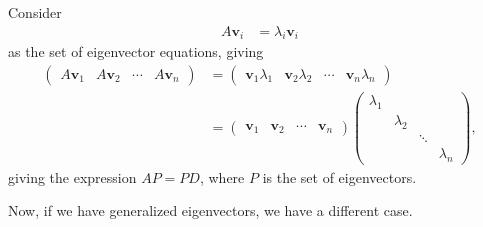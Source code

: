 \documentclass[10pt]{mypackage}
\begin{document}
\begin{example}
  Consider
  \begin{align*}
    A\mathbf{v}_i &= \lambda_i \mathbf{v}_i
  \end{align*}
  as the set of eigenvector equations, giving
  \begin{align*}
    \begin{pmatrix}A\mathbf{v}_1 & A\mathbf{v}_2 & \cdots & A\mathbf{v}_n\end{pmatrix} &= \begin{pmatrix}\mathbf{v}_1\lambda_1 & \mathbf{v}_2\lambda_2 & \cdots & \mathbf{v}_n\lambda_n\end{pmatrix}\\
                                 &= \begin{pmatrix}\mathbf{v}_1 & \mathbf{v}_2 & \cdots & \mathbf{v}_n\end{pmatrix} \begin{pmatrix}\lambda_1 & & & \\ & \lambda_2 & &  \\ & & \ddots & \\ & & & \lambda_n\end{pmatrix},
  \end{align*}
  giving the expression $AP = PD$, where $P$ is the set of eigenvectors.\newline

  Now, if we have generalized eigenvectors, we have a different case.\newline


\end{example}
\end{document}
